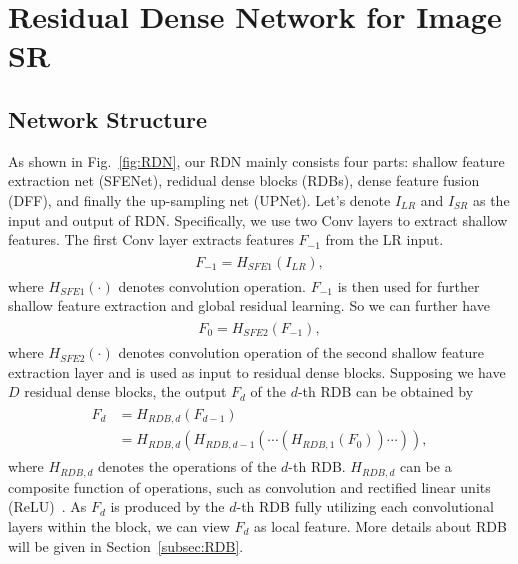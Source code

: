 \documentclass[10pt,twocolumn,letterpaper]{article}
\begin{document}
\section{Residual Dense Network for Image SR}
\subsection{Network Structure}
\label{sec:network}
As shown in Fig.~\ref{fig:RDN}, our RDN mainly consists four parts: shallow feature extraction net (SFENet), redidual dense blocks (RDBs), dense feature fusion (DFF), and finally the up-sampling net (UPNet). Let's denote $I_{LR}$ and $I_{SR}$ as the input and output of RDN. Specifically, we use two Conv layers to extract shallow features. The first Conv layer extracts features $F_{-1}$ from the LR input.
\begin{align}
\begin{split}
\label{eq:SFE1}
F_{-1}=H_{SFE1}\left ( I_{LR} \right ),
\end{split}
\end{align}
where $H_{SFE1}\left ( \cdot  \right )$ denotes convolution operation. $F_{-1}$ is then used for further shallow feature extraction and global residual learning. So we can further have
\begin{align}
\begin{split}
\label{eq:SFE2}
F_{0}=H_{SFE2}\left ( F_{-1} \right ),
\end{split}
\end{align}
where $H_{SFE2}\left ( \cdot  \right )$ denotes convolution operation of the second shallow feature extraction layer and is used as input to residual dense blocks. Supposing we have $D$ residual dense blocks, the output $F_{d}$ of the $d$-th RDB can be obtained by
\begin{align}
\begin{split}
\label{eq:F_d_RDN}
F_{d}&=H_{RDB,d}\left ( F_{d-1} \right )\\
&=H_{RDB,d}\left ( H_{RDB,{d-1}}\left ( \cdots \left ( H_{RDB,1}\left ( F_{0} \right ) \right ) \cdots \right ) \right ),
\end{split}
\end{align}
where $H_{RDB,d}$ denotes the operations of the $d$-th RDB. $H_{RDB,d}$ can be a composite function of operations, such as convolution and rectified linear units (ReLU)~\cite{glorot2011deep}. As $F_{d}$ is produced by the $d$-th RDB fully utilizing each convolutional layers within the block, we can view $F_{d}$ as local feature. More details about RDB will be given in Section~\ref{subsec:RDB}.
\end{document}
